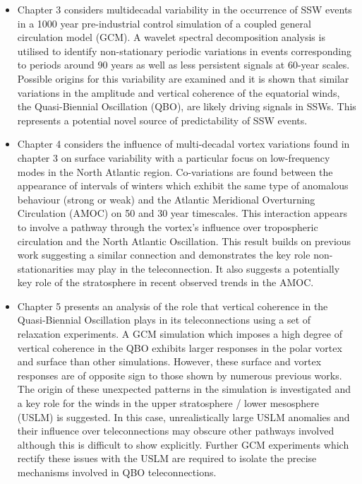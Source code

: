 \begin{itemize}
    \item Chapter 3 considers multidecadal variability in the occurrence of SSW events in a 1000 year pre-industrial control simulation of a coupled general circulation model (GCM). A wavelet spectral decomposition analysis is utilised to identify non-stationary periodic variations in events corresponding to periods around 90 years as well as less persistent signals at 60-year scales. Possible origins for this variability are examined and it is shown that similar variations in the amplitude and vertical coherence of the equatorial winds, the Quasi-Biennial Oscillation (QBO), are likely driving signals in SSWs. This represents a potential novel source of predictability of SSW events.
    
    \item Chapter 4 considers the influence of multi-decadal vortex variations found in chapter 3 on surface variability with a particular focus on low-frequency modes in the North Atlantic region. Co-variations are found between the appearance of intervals of winters which exhibit the same type of anomalous behaviour (strong or weak) and the Atlantic Meridional Overturning Circulation (AMOC) on 50 and 30 year timescales. This interaction appears to involve a pathway through the vortex's influence over tropospheric circulation and the North Atlantic Oscillation. This result builds on previous work suggesting a similar connection and demonstrates the key role non-stationarities may play in the teleconnection. It also suggests a potentially key role of the stratosphere in recent observed trends in the AMOC. 
    
    \item Chapter 5 presents an analysis of the role that vertical coherence in the Quasi-Biennial Oscillation plays in its teleconnections using a set of relaxation experiments. A GCM simulation which imposes a high degree of vertical coherence in the QBO exhibits larger responses in the polar vortex and surface than other simulations. However, these surface and vortex responses are of opposite sign to those shown by numerous previous works. The origin of these unexpected patterns in the simulation is investigated and a key role for the winds in the upper stratosphere / lower mesosphere (USLM) is suggested. In this case, unrealistically large USLM anomalies and their influence over teleconnections may obscure other pathways involved although this is difficult to show explicitly. Further GCM experiments which rectify these issues with the USLM are required to isolate the precise mechanisms involved in QBO teleconnections.  
\end{itemize}

